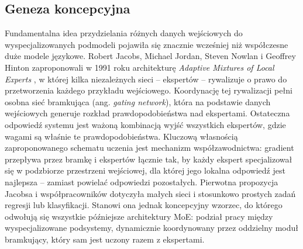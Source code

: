 \subsection{Geneza koncepcyjna}
\label{sec:moe_geneza}
Fundamentalna idea przydzielania różnych danych wejściowych do wyspecjalizowanych podmodeli pojawiła się znacznie wcześniej niż współczesne duże modele językowe. Robert Jacobs, Michael Jordan, Steven Nowlan i Geoffrey Hinton zaproponowali w 1991 roku architekturę \textit{Adaptive Mixtures of Local Experts} \cite{jacobs_1991_adaptive_mixtures_of_local_experts}, w której kilka niezależnych sieci -- ekspertów -- rywalizuje o prawo do przetworzenia każdego przykładu wejściowego. Koordynację tej rywalizacji pełni osobna sieć bramkująca (ang. \textit{gating network}), która na podstawie danych wejściowych generuje rozkład prawdopodobieństwa nad ekspertami. Ostateczna odpowiedź systemu jest ważoną kombinacją wyjść wszystkich ekspertów, gdzie wagami są właśnie te prawdopodobieństwa. Kluczową własnością zaproponowanego schematu uczenia jest mechanizm współzawodnictwa: gradient przepływa przez bramkę i ekspertów łącznie tak, by każdy ekspert specjalizował się w podzbiorze przestrzeni wejściowej, dla której jego lokalna odpowiedź jest najlepsza -- zamiast powielać odpowiedzi pozostałych. \newline
Pierwotna propozycja Jacobsa i współpracowników dotyczyła małych sieci i stosunkowo prostych zadań regresji lub klasyfikacji. Stanowi ona jednak koncepcyjny wzorzec, do którego odwołują się wszystkie późniejsze architektury MoE: podział pracy między wyspecjalizowane podsystemy, dynamicznie koordynowany przez oddzielny moduł bramkujący, który sam jest uczony razem z ekspertami.
